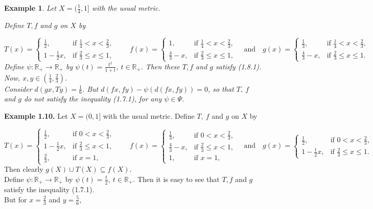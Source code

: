 \documentclass[11]{article}
\newtheorem{example}[definition]{Example}
\numberwithin{equation}{definition}
\begin{document}
\begin{example}
Let $X=(\frac{1}{4},1]$ with the usual metric.

Define $T,f$ and $g$ on $X$ by


\[
T(x)=
\begin{cases}
\frac{1}{2}, & \text{if } \frac{1}{4}<x<\frac{2}{3},\\
1-\frac{1}{2}x, & \text{if } \frac{2}{3}\le x\le 1,
\end{cases}
\qquad
f(x)=
\begin{cases}
1, & \text{if } \frac{1}{4}<x<\frac{2}{3},\\
\frac{4}{3}-x, & \text{if } \frac{2}{3}\le x\le 1,
\end{cases}
\quad \text{and} \quad
g(x)=
\begin{cases}
\frac{1}{3}, & \text{if } \frac{1}{4}<x<\frac{2}{3},\\
\frac{4}{3}-x, & \text{if } \frac{2}{3}\le x\le 1.
\end{cases}
\]
Define \(\psi:\mathbb{R}_{+}\to \mathbb{R}_{+}\) by \(\psi(t)=\frac{t^{2}}{1+t}\), \(t\in \mathbb{R}_{+}.\) Then these \(T,f\) and \(g\) satisfy (1.8.1). Now, \(x,y\in(\frac{1}{4},\frac{2}{3})\).\\
Consider \(d(gx,Ty)=\frac{1}{6}\).
But \(d(fx,fy)-\psi(d(fx,fy))=0\), so that \(T,\ f\) and \(g\) do not satisfy the inequality (1.7.1), for any \(\psi\in\Psi\).
\end{example}

\textbf{Example 1.10.} Let \(X=(0,1]\) with the usual metric.
Define \(T,\ f\) and \(g\) on \(X\) by


\[
T(x)=
\begin{cases}
\frac{1}{2}, & \text{if } 0<x<\frac{2}{3},\\
1-\frac{1}{2}x, & \text{if } \frac{2}{3}\le x<1,\\
\frac{2}{3}, & \text{if } x=1,
\end{cases}
\qquad
f(x)=
\begin{cases}
\frac{1}{3}, & \text{if } 0<x<\frac{2}{3},\\
\frac{4}{3}-x, & \text{if } \frac{2}{3}\le x<1,\\
1, & \text{if } x=1,
\end{cases}
\quad \text{and} \quad
g(x)=
\begin{cases}
\frac{1}{2}, & \text{if } 0<x<\frac{2}{3},\\
1-\frac{1}{2}x, & \text{if } \frac{2}{3}\le x\le 1.
\end{cases}
\]
Then clearly \(g(X)\cup T(X)\subseteq f(X)\).\\
Define \(\psi:\mathbb{R}_{+}\to \mathbb{R}_{+}\) by \(\psi(t)=\frac{t}{2},\ t\in \mathbb{R}_{+}.\) Then it is easy to see that \(T,f\) and \(g\) satisfy the inequality (1.7.1).\\
But for \(x=\frac{2}{3}\) and \(y=\frac{5}{6}\),
\end{document}
